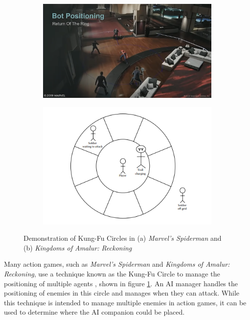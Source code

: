 \documentclass{IEEEtran}
\begin{document}
\begin{figure}
  \centering
  
  \begin{subfigure}[a]{\linewidth}
  \includegraphics[width=\linewidth]{Images/IndustryResearch/SpidermanKungFuCircle.png}
  \end{subfigure}
  
  \begin{subfigure}[b]{\linewidth}
  \includegraphics[width=\linewidth]{Images/IndustryResearch/KOARKungFuCircle.png}
  \end{subfigure}
  
  \caption{Demonstration of Kung-Fu Circles in (a) \textit{Marvel's Spiderman} and (b) \textit{Kingdoms of Amalur: Reckoning}}
  \label{fig:KungFuCircle}
\end{figure}

Many action games, such as \textit{Marvel's Spiderman} and \textit{Kingdoms of Amalur: Reckoning}, use a technique known as the Kung-Fu Circle to manage the positioning of multiple agents \cite{GAIPKungFuCircle, GDCSpiderman}, shown in figure \ref{fig:KungFuCircle}. An AI manager handles the positioning of enemies in this circle and manages when they can attack. While this technique is intended to manage multiple enemies in action games, it can be used to determine where the AI companion could be placed.
\end{document}
